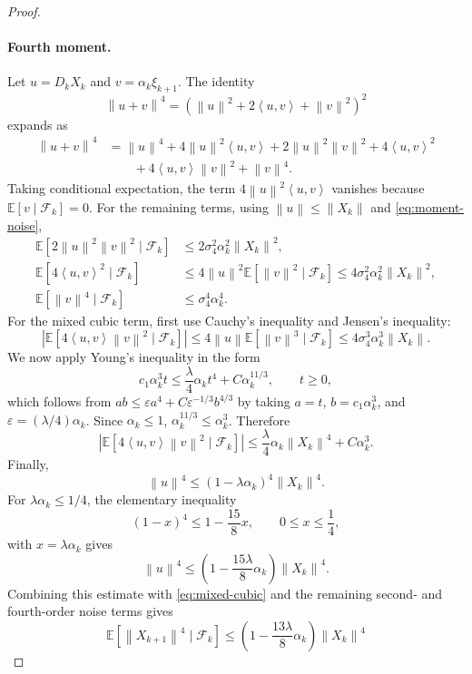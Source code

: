 \documentclass{article}
\newcommand{\E}{\mathbb{E}}
\newcommand{\norm}[1]{\left\lVert #1\right\rVert}
\newcommand{\ip}[2]{\left\langle #1,#2\right\rangle}
\begin{document}
\begin{proof}
\paragraph{Fourth moment.}
Let $u=D_kX_k$ and $v=\alpha_k\xi_{k+1}$. The identity
\[
  \norm{u+v}^4=(\norm{u}^2+2\ip{u}{v}+\norm{v}^2)^2
\]
expands as
\begin{align*}
  \norm{u+v}^4
  &=\norm{u}^4+4\norm{u}^2\ip{u}{v}
    +2\norm{u}^2\norm{v}^2+4\ip{u}{v}^2\\
  &\qquad +4\ip{u}{v}\norm{v}^2+\norm{v}^4.
\end{align*}
Taking conditional expectation, the term $4\norm{u}^2\ip{u}{v}$ vanishes because $\E[v\mid\mathcal F_k]=0$. For the remaining terms, using $\norm{u}\le\norm{X_k}$ and \eqref{eq:moment-noise},
\begin{align*}
  \E[2\norm{u}^2\norm{v}^2\mid\mathcal F_k]
  &\le 2\sigma_4^2\alpha_k^2\norm{X_k}^2,\\
  \E[4\ip{u}{v}^2\mid\mathcal F_k]
  &\le 4\norm{u}^2\E[\norm{v}^2\mid\mathcal F_k]
   \le 4\sigma_4^2\alpha_k^2\norm{X_k}^2,\\
  \E[\norm{v}^4\mid\mathcal F_k]
  &\le \sigma_4^4\alpha_k^4.
\end{align*}
For the mixed cubic term, first use Cauchy's inequality and Jensen's inequality:
\[
  \left|\E[4\ip{u}{v}\norm{v}^2\mid\mathcal F_k]\right|
  \le 4\norm{u}\E[\norm{v}^3\mid\mathcal F_k]
  \le 4\sigma_4^3\alpha_k^3\norm{X_k}.
\]
We now apply Young's inequality in the form
\[
  c_1\alpha_k^3 t
  \le \frac{\lambda}{4}\alpha_k t^4+C\alpha_k^{11/3},
  \qquad t\ge0, \label{eq:young-fourth}
\]
which follows from $ab\le \varepsilon a^4 + C\varepsilon^{-1/3}b^{4/3}$ by taking $a=t$, $b=c_1\alpha_k^3$, and $\varepsilon=(\lambda/4)\alpha_k$. Since $\alpha_k\le1$, $\alpha_k^{11/3}\le\alpha_k^3$. Therefore
\begin{equation}
  \left|\E[4\ip{u}{v}\norm{v}^2\mid\mathcal F_k]\right|
  \le \frac{\lambda}{4}\alpha_k\norm{X_k}^4+C\alpha_k^3. \label{eq:mixed-cubic}
\end{equation}
Finally,
\[
  \norm{u}^4\le(1-\lambda\alpha_k)^4\norm{X_k}^4.
\]
For $\lambda\alpha_k\le1/4$, the elementary inequality
\[
  (1-x)^4\le 1-\frac{15}{8}x,\qquad 0\le x\le\frac14,
\]
with $x=\lambda\alpha_k$ gives
\[
  \norm{u}^4\le \left(1-\frac{15\lambda}{8}\alpha_k\right)\norm{X_k}^4.
\]
Combining this estimate with \eqref{eq:mixed-cubic} and the remaining second- and fourth-order noise terms gives
\[
  \E[\norm{X_{k+1}}^4\mid\mathcal F_k]
  \le \left(1-\frac{13\lambda}{8}\alpha_k\right)\norm{X_k}^4
\]
\end{proof}
\end{document}
